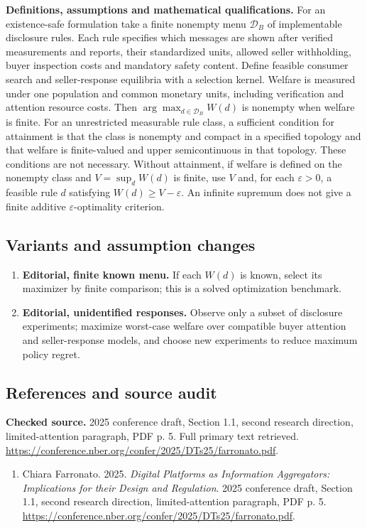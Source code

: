 \documentclass[11pt,a4paper]{article}
\begin{document}
\textbf{Definitions, assumptions and mathematical qualifications.} For an existence-safe formulation take a finite nonempty menu \(\mathcal D_B\) of implementable disclosure rules. Each rule specifies which messages are shown after verified measurements and reports, their standardized units, allowed seller withholding, buyer inspection costs and mandatory safety content. Define feasible consumer search and seller-response equilibria with a selection kernel. Welfare is measured under one population and common monetary units, including verification and attention resource costs. Then \(\arg\max_{d\in\mathcal D_B}W(d)\) is nonempty when welfare is finite. For an unrestricted measurable rule class, a sufficient condition for attainment is that the class is nonempty and compact in a specified topology and that welfare is finite-valued and upper semicontinuous in that topology. These conditions are not necessary. Without attainment, if welfare is defined on the nonempty class and \(V=\sup_dW(d)\) is finite, use \(V\) and, for each \(\varepsilon>0\), a feasible rule \(d\) satisfying \(W(d)\geq V-\varepsilon\). An infinite supremum does not give a finite additive \(\varepsilon\)-optimality criterion.
\subsection*{Variants and assumption changes}
\begin{enumerate}
\item \textbf{Editorial, finite known menu.} If each \(W(d)\) is known, select its maximizer by finite comparison; this is a solved optimization benchmark.
\item \textbf{Editorial, unidentified responses.} Observe only a subset of disclosure experiments; maximize worst-case welfare over compatible buyer attention and seller-response models, and choose new experiments to reduce maximum policy regret.
\end{enumerate}
\subsection*{References and source audit}
\textbf{Checked source.} 2025 conference draft, Section 1.1, second research direction, limited-attention paragraph, PDF p. 5. Full primary text retrieved. \url{https://conference.nber.org/confer/2025/DTs25/farronato.pdf}.
\begin{enumerate}\raggedright
\item\hypertarget{definitions:source:30007684:1}{} Chiara Farronato. 2025. \emph{Digital Platforms as Information Aggregators: Implications for their Design and Regulation}. 2025 conference draft, Section 1.1, second research direction, limited-attention paragraph, PDF p. 5.
\url{https://conference.nber.org/confer/2025/DTs25/farronato.pdf}.
\end{enumerate}
\end{document}
